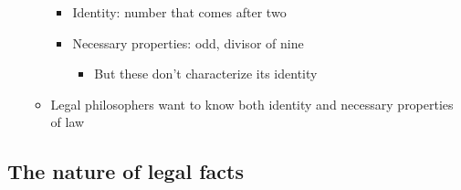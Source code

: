 \begin{itemize}
\begin{itemize}
    \begin{itemize}
    \tightlist
    \item
      Identity: number that comes after two
    \item
      Necessary properties: odd, divisor of nine

      \begin{itemize}
      \tightlist
      \item
        But these don't characterize its identity
      \end{itemize}
    \end{itemize}
  \item
    Legal philosophers want to know both identity and necessary
    properties of law
  \end{itemize}
\end{itemize}

\hypertarget{the-nature-of-legal-facts}{%
\subsection{The nature of legal facts}\label{the-nature-of-legal-facts}}

